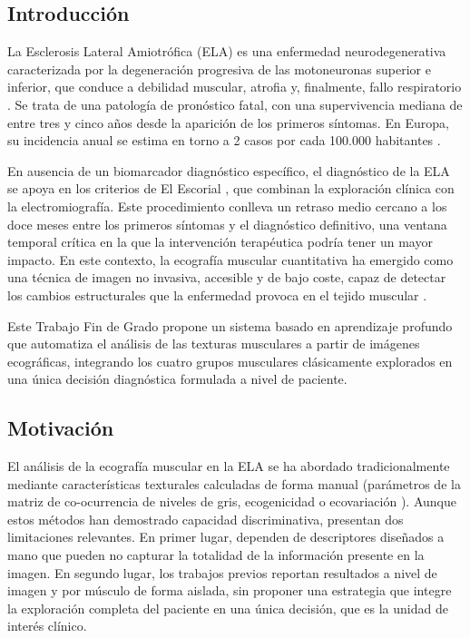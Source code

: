 \documentclass[12pt]{extarticle}
\numberwithin{equation}{section}
\begin{document}
\begin{refsection}
\section{Introducci\'on}

La Esclerosis Lateral Amiotr\'ofica (ELA) es una enfermedad neurodegenerativa caracterizada por la degeneraci\'on progresiva de las motoneuronas superior e inferior, que conduce a debilidad muscular, atrofia y, finalmente, fallo respiratorio \cite{brown2017als, hardiman2017als}. Se trata de una patolog\'ia de pron\'ostico fatal, con una supervivencia mediana de entre tres y cinco a\~nos desde la aparici\'on de los primeros s\'intomas. En Europa, su incidencia anual se estima en torno a 2 casos por cada 100.000 habitantes \cite{logroscino2010incidence}.

En ausencia de un biomarcador diagn\'ostico espec\'ifico, el diagn\'ostico de la ELA se apoya en los criterios de El Escorial \cite{brooks2000escorial}, que combinan la exploraci\'on cl\'inica con la electromiograf\'ia. Este procedimiento conlleva un retraso medio cercano a los doce meses entre los primeros s\'intomas y el diagn\'ostico definitivo, una ventana temporal cr\'itica en la que la intervenci\'on terap\'eutica podr\'ia tener un mayor impacto. En este contexto, la ecograf\'ia muscular cuantitativa ha emergido como una t\'ecnica de imagen no invasiva, accesible y de bajo coste, capaz de detectar los cambios estructurales que la enfermedad provoca en el tejido muscular \cite{pillen2008muscle, martinezpaya2017quantitative}.

Este Trabajo Fin de Grado propone un sistema basado en aprendizaje profundo que automatiza el an\'alisis de las texturas musculares a partir de im\'agenes ecogr\'aficas, integrando los cuatro grupos musculares cl\'asicamente explorados en una \'unica decisi\'on diagn\'ostica formulada a nivel de paciente.

\subsection{Motivaci\'on}

El an\'alisis de la ecograf\'ia muscular en la ELA se ha abordado tradicionalmente mediante caracter\'isticas texturales calculadas de forma manual (par\'ametros de la matriz de co-ocurrencia de niveles de gris, ecogenicidad o ecovariaci\'on \cite{martinezpaya2017quantitative, martinezpaya2018monitoring}). Aunque estos m\'etodos han demostrado capacidad discriminativa, presentan dos limitaciones relevantes. En primer lugar, dependen de descriptores dise\~nados a mano que pueden no capturar la totalidad de la informaci\'on presente en la imagen. En segundo lugar, los trabajos previos reportan resultados a nivel de imagen y por m\'usculo de forma aislada, sin proponer una estrategia que integre la exploraci\'on completa del paciente en una \'unica decisi\'on, que es la unidad de inter\'es cl\'inico.


\end{refsection}
\end{document}
